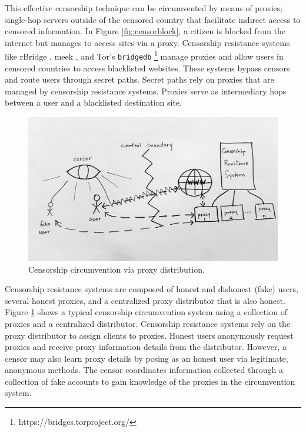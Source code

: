 This effective censorship technique can be circumvented by means of proxies; single-hop servers outside of the censored country that facilitate indirect access to censored information. In Figure \ref{fig:censorblock}, a citizen is blocked from the internet but manages to access sites via a proxy. Censorship resistance systems like rBridge \cite{wang2013rbridge}, meek \cite{Fifield2017a}, and Tor's \texttt{bridgedb} \footnote{https://bridges.torproject.org/} manage proxies and allow users in censored countries to access blacklisted websites. These systems bypass censors and route users through secret paths. Secret paths rely on proxies that are managed by censorship resistance systems. Proxies serve as intermediary hops between a user and a blacklisted destination site.

\begin{figure}[h!]
\centering
     \includegraphics[width=1.0\textwidth]{fig/censor_crs.png}
    \caption{Censorship circumvention via proxy distribution.}
    \label{fig:proxydistro}
\end{figure}

Censorship resistance systems are composed of honest and dishonest (fake) users, several honest proxies, and a centralized proxy distributor that is also honest. Figure \ref{fig:proxydistro} shows a typical censorship circumvention system using a collection of proxies and a centralized distributor. Censorship resistance systems rely on the proxy distributor to assign clients to proxies. Honest users anonymously request proxies and receive proxy information details from the distributor. However, a censor may also learn proxy details by posing as an honest user via legitimate, anonymous methods. The censor coordinates information collected through a collection of fake accounts to gain knowledge of the proxies in the circumvention system.


